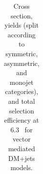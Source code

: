 \begin{table}
{\begin{tabular}{rrlrrrrr}
    \hline\hline
    \end{tabular}
    }
    \caption{Cross section, yields (split according to symmetric, asymmetric, 
        and monojet categories), and total selection efficiency at $6.3$~\ifb 
        for vector mediated DM+jets models.}
    \label{tab:DMV_yld}
\end{table}

